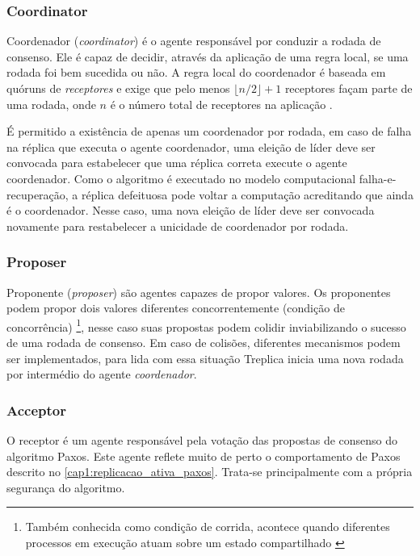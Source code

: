 \subsubsection{Coordinator}

Coordenador (\emph{coordinator}) é o agente responsável por conduzir a rodada de consenso.
Ele é capaz de decidir, através da aplicação de uma regra local, se uma rodada foi bem
sucedida ou não. A regra local do coordenador é baseada em quóruns de \emph{receptores} e
exige que pelo menos $\lfloor n/2 \rfloor + 1$ receptores façam parte de uma rodada, onde
$n$ é o número total de receptores na aplicação \cite{lamport98}.

É permitido a existência de apenas um coordenador por rodada, em caso de falha na réplica
que executa o agente coordenador, uma eleição de líder deve ser convocada para estabelecer
que uma réplica correta execute o agente coordenador. Como o algoritmo é executado no
modelo computacional falha-e-recuperação, a réplica defeituosa pode voltar a computação
acreditando que ainda é o coordenador. Nesse caso, uma nova eleição de líder deve ser
convocada novamente para restabelecer a unicidade de coordenador por rodada.

\subsubsection{Proposer}

Proponente (\emph{proposer}) são agentes capazes de propor valores. Os proponentes podem
propor dois valores diferentes concorrentemente (condição de concorrência)
\footnote{Também conhecida como condição de corrida, acontece quando diferentes processos
em execução atuam sobre um estado compartilhado \cite{alguem}}, nesse caso suas propostas
podem colidir inviabilizando o sucesso de uma rodada de consenso. Em caso de colisões,
diferentes mecanismos podem ser implementados, para lida com essa situação Treplica inicia
uma nova rodada por intermédio do agente \emph{coordenador}.

\subsubsection{Acceptor}

O receptor é um agente responsável pela votação das propostas de consenso do algoritmo
Paxos. Este agente reflete muito de perto o comportamento de Paxos descrito no
\autoref{cap1:replicacao_ativa_paxos}. Trata-se principalmente com a própria segurança do
algoritmo. 

